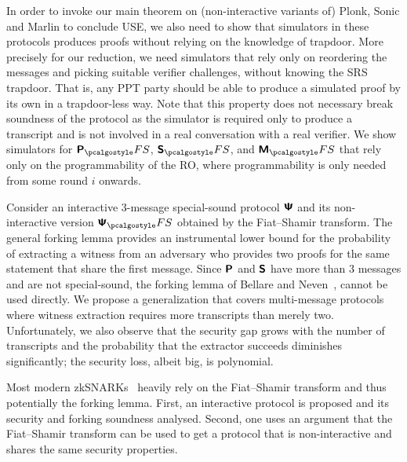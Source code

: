   In order to invoke our main theorem on
(non-interactive variants of) Plonk, Sonic and Marlin to conclude USE, we also need to show
that simulators in these protocols produces proofs without relying on the knowledge of
trapdoor. More precisely for our reduction, we need simulators that rely only on reordering the
messages and picking suitable verifier challenges, without knowing the SRS trapdoor.  That is,
any PPT party should be able to produce a simulated proof by its own in a trapdoor-less
way. Note that this property does not necessary break soundness of the protocol as the
simulator is required only to produce a transcript and is not involved in a real conversation
with a real verifier. We show simulators for $\plonkprotfs$, $\sonicprotfs$, and
$\marlinprotfs$ that rely only on the programmability of the RO, where programmability is only
needed from some round $i$ onwards.    

  Consider an interactive $3$-message
special-sound protocol $\bm{\mathsf{\Psi}}$ and its non-interactive version $\ps_\fs$ obtained by the
Fiat--Shamir transform. The general forking lemma provides an instrumental lower bound for the
probability of extracting a witness from an adversary who provides two proofs for the same
statement that share the first message. Since $\bm{\mathsf{P}}$ and $\bm{\mathsf{S}}$ have more than $3$
messages and are not special-sound, the forking lemma of Bellare and Neven~\cite{CCS:BelNev06},
cannot be used directly. We propose a generalization that covers multi-message protocols where
witness extraction requires more transcripts than merely two.  Unfortunately, we also observe
that the security gap grows with the number of transcripts and the probability that the
extractor succeeds diminishes significantly; the security loss, albeit big, is polynomial.

Most modern zkSNARKs~\cite{SP:BBBPWM18,CCS:MBKM19} heavily
rely on the Fiat--Shamir transform and thus potentially the forking lemma. First, an interactive
protocol is proposed and its security and forking soundness analysed. Second,
one uses an argument that the Fiat--Shamir transform can be used to get a
protocol that is non-interactive and shares the same security properties.


